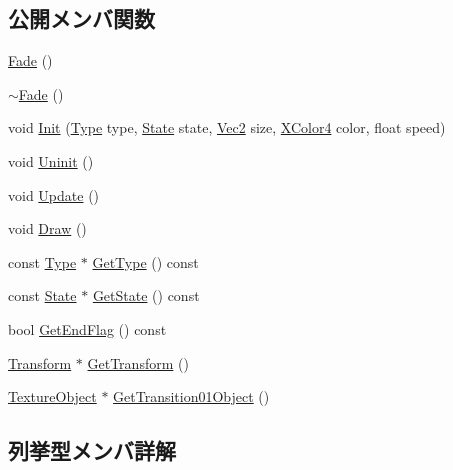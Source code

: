 \subsection*{公開メンバ関数}
\begin{DoxyCompactItemize}
\item 
\mbox{\hyperlink{class_fade_aec1ac5a0a80be8d7a2a43dbde2a741ee}{Fade}} ()
\item 
\mbox{\hyperlink{class_fade_a58ddf7585cb85bf84f5e83adbe2734f9}{$\sim$\+Fade}} ()
\item 
void \mbox{\hyperlink{class_fade_aab12848f7102a219968c86ed699a6e5d}{Init}} (\mbox{\hyperlink{class_fade_ac06f27215b454aa05b93c236476d6e80}{Type}} type, \mbox{\hyperlink{class_fade_ae77826bf3ff2ab95fb7b3b6f95cba80a}{State}} state, \mbox{\hyperlink{_vector3_d_8h_a5ef6e95dfc5f9d3820b71772d99bbc25}{Vec2}} size, \mbox{\hyperlink{_vector3_d_8h_a680c30c4a07d86fe763c7e01169cd6cc}{X\+Color4}} color, float speed)
\item 
void \mbox{\hyperlink{class_fade_abf68444af1314ad502d1109940b2ab5c}{Uninit}} ()
\item 
void \mbox{\hyperlink{class_fade_a1579b5b9020344a1131ea11c15f2c0bd}{Update}} ()
\item 
void \mbox{\hyperlink{class_fade_a521f3cb7e82fb71360bab568bcf933c9}{Draw}} ()
\item 
const \mbox{\hyperlink{class_fade_ac06f27215b454aa05b93c236476d6e80}{Type}} $\ast$ \mbox{\hyperlink{class_fade_aed5a29d39a5fd6161a9aed73d5f30870}{Get\+Type}} () const
\item 
const \mbox{\hyperlink{class_fade_ae77826bf3ff2ab95fb7b3b6f95cba80a}{State}} $\ast$ \mbox{\hyperlink{class_fade_aeb41dfcadf75dd4c980da68e243cc310}{Get\+State}} () const
\item 
bool \mbox{\hyperlink{class_fade_acc8adf28ce2e4270e5fb3907d83dadd0}{Get\+End\+Flag}} () const
\item 
\mbox{\hyperlink{class_transform}{Transform}} $\ast$ \mbox{\hyperlink{class_fade_a1a177209e72a27858ceb2d339321e9c4}{Get\+Transform}} ()
\item 
\mbox{\hyperlink{class_texture_object}{Texture\+Object}} $\ast$ \mbox{\hyperlink{class_fade_a4e047c532d430095e7d0d70288289a82}{Get\+Transition01\+Object}} ()
\end{DoxyCompactItemize}


\subsection{列挙型メンバ詳解}
\mbox{\label{class_fade_ae77826bf3ff2ab95fb7b3b6f95cba80a}} 

